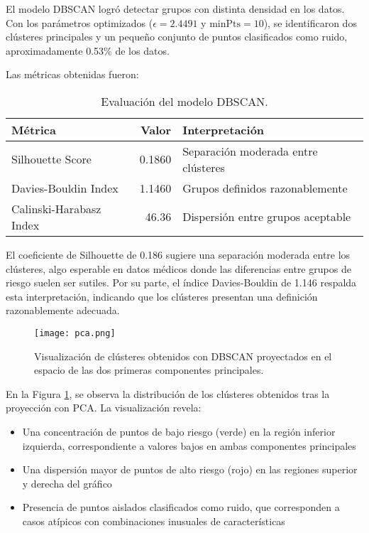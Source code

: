 \documentclass[12pt]{article}
\begin{document}
El modelo DBSCAN logró detectar grupos con distinta densidad en los datos. Con los parámetros optimizados ($\epsilon = 2.4491$ y $\text{minPts} = 10$), se identificaron dos clústeres principales y un pequeño conjunto de puntos clasificados como ruido, aproximadamente 0.53\% de los datos.

Las métricas obtenidas fueron:

\begin{table}[h]
\caption{Evaluación del modelo DBSCAN.}
\centering
\begin{tabular}{|l|r|p{6cm}|}
\hline
\textbf{Métrica} & \textbf{Valor} & \textbf{Interpretación} \\ \hline \hline
Silhouette Score & 0.1860 & Separación moderada entre clústeres \\ \hline
Davies-Bouldin Index & 1.1460 &  Grupos definidos razonablemente\\ \hline
Calinski-Harabasz Index & 46.36 & Dispersión entre grupos aceptable \\ \hline
\end{tabular}
\label{tab:metricas}
\end{table}

El coeficiente de Silhouette de 0.186 sugiere una separación moderada entre los clústeres, algo esperable en datos médicos donde las diferencias entre grupos de riesgo suelen ser sutiles. Por su parte, el índice Davies-Bouldin de 1.146 respalda esta interpretación, indicando que los clústeres presentan una definición razonablemente adecuada.

\begin{figure}[H]
\centering
\texttt{[image: pca.png]}
\caption{Visualización de clústeres obtenidos con DBSCAN proyectados en el espacio de las dos primeras componentes principales.}
\label{fig:clusters}
\end{figure}

En la Figura \ref{fig:clusters}, se observa la distribución de los clústeres obtenidos tras la proyección con PCA. La visualización revela:

\begin{itemize}
\item Una concentración de puntos de bajo riesgo (verde) en la región inferior izquierda, correspondiente a valores bajos en ambas componentes principales
\item Una dispersión mayor de puntos de alto riesgo (rojo) en las regiones superior y derecha del gráfico
\item Presencia de puntos aislados clasificados como ruido, que corresponden a casos atípicos con combinaciones inusuales de características
\end{itemize}
\end{document}
